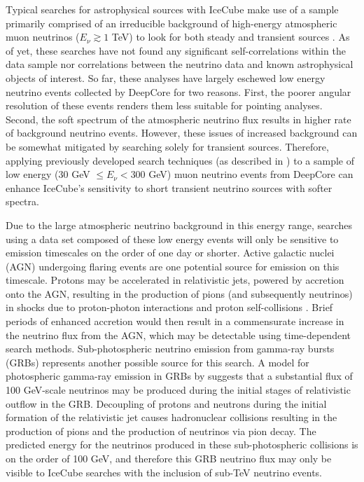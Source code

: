 \documentclass[manuscript]{aastex}
\begin{document}
Typical searches for astrophysical sources with IceCube make use of a sample primarily comprised of an irreducible background of high-energy atmospheric muon neutrinos ($E_{\nu} \gtrsim 1$ TeV) to look for both steady \citep{2014ApJ...796..109A} and transient sources \citep{0004-637X-807-1-46}. As of yet, these searches have not found any significant self-correlations within the data sample nor correlations between the neutrino data and known astrophysical objects of interest. So far, these analyses have largely eschewed low energy neutrino events collected by DeepCore for two reasons. First, the poorer angular resolution of these events renders them less suitable for pointing analyses. Second, the soft spectrum of the atmospheric neutrino flux results in higher rate of background neutrino events. However, these issues of increased background can be somewhat mitigated by searching solely for transient sources. Therefore, applying previously developed search techniques (as described in \cite{2010APh....33..175B}) to a sample of low energy (30 GeV $\leq E_{\nu} < 300$ GeV) muon neutrino events from DeepCore can enhance IceCube's sensitivity to short transient neutrino sources with softer spectra.

Due to the large atmospheric neutrino background in this energy range, searches using a data set composed of these low energy events will only be sensitive to emission timescales on the order of one day or shorter. Active galactic nuclei (AGN) undergoing flaring events are one potential source for emission on this timescale. Protons may be accelerated in relativistic jets, powered by accretion onto the AGN, resulting in the production of pions (and subsequently neutrinos) in shocks due to proton-photon interactions and proton self-collisions \citep{2009APh....31..138B}. Brief periods of enhanced accretion would then result in a commensurate increase in the neutrino flux from the AGN, which may be detectable using time-dependent search methods. Sub-photospheric neutrino emission from gamma-ray bursts (GRBs) represents another possible source for this search. A model for photospheric gamma-ray emission in GRBs by \cite{2013PhRvL.111m1102M} suggests that a substantial flux of 100 GeV-scale neutrinos may be produced during the initial stages of relativistic outflow in the GRB. Decoupling of protons and neutrons during the initial formation of the relativistic jet causes hadronuclear collisions resulting in the production of pions and the production of neutrinos via pion decay. The predicted energy for the neutrinos produced in these sub-photospheric collisions is on the order of 100 GeV, and therefore this GRB neutrino flux may only be visible to IceCube searches with the inclusion of sub-TeV neutrino events. 
\end{document}
